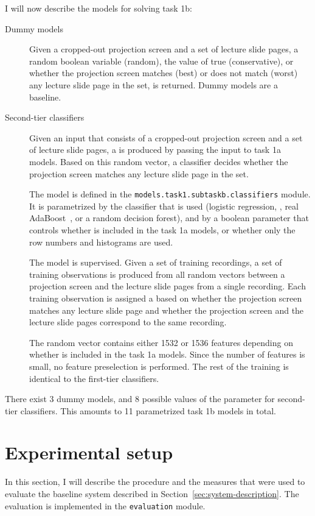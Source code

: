 I will now describe the models for solving task 1b:
\begin{description}
  \item[Dummy models]
    Given a cropped-out projection screen and a set of lecture slide pages, a
    random boolean variable (random), the value of true (conservative), or
    whether the projection screen matches (best) or does not match (worst) any
    lecture slide page in the set, is returned. Dummy models are a baseline.

  \item[Second-tier classifiers]
    Given an input that consists of a cropped-out projection screen and
    a set of lecture slide pages, a  is produced
    by passing the input to task 1a models. Based on this random vector, a
    classifier decides whether the projection screen matches any lecture slide
    page in the set.
    
    The model is defined in the \texttt{models.task1.subtaskb.classifiers}
    module. It is parametrized by the classifier that is used (logistic
    regression, , real AdaBoost~\cite{friedman2000additive}, or a
    random decision forest), and by a boolean parameter that controls whether
     is included in the task 1a models, or whether only the row
    numbers and histograms are used.

    The model is supervised. Given a set of training recordings, a set of
    training observations is produced from all random vectors between a
    projection screen and the lecture slide pages from a single recording. Each
    training observation is assigned a  based on whether the
    projection screen matches any lecture slide page and whether the projection
    screen and the lecture slide pages correspond to the same recording.

    The random vector contains either 1532 or 1536 features depending on
    whether  is included in the task 1a models. Since the number of
    features is small, no feature preselection is performed. The rest of the
    training is identical to the first-tier classifiers.
\end{description}
There exist 3 dummy models, and 8 possible values of the parameter for
second-tier classifiers. This amounts to 11 parametrized task 1b models in
total.

\section{Experimental setup}
\label{sec:experimental-setup}
In this section, I will describe the procedure and the measures that were used
to evaluate the baseline system described in Section~\ref{sec:system-description}.
The evaluation is implemented in the \texttt{evaluation} module.

